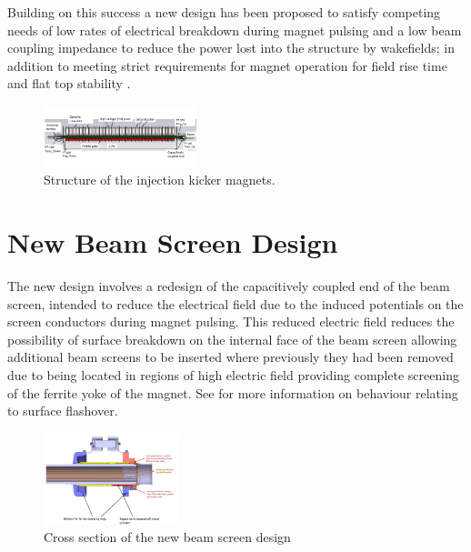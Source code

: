\documentclass[a4paper,
              ]{jacow}
\begin{document}
Building on this success a new design has been proposed to satisfy competing needs of low rates of electrical breakdown during magnet pulsing and a low beam coupling impedance to reduce the power lost into the structure by wakefields; in addition to meeting strict requirements for magnet operation for field rise time and flat top stability \cite{mkiUpgrade}. 

\begin{figure}
\includegraphics[width=0.4\textwidth]{MKICrossSectionYZ.pdf}
\caption{Structure of the injection kicker magnets.}
\label{fig:mkiStruct}
\end{figure}

\section{New Beam Screen Design}

The new design involves a redesign of the capacitively coupled end of the beam screen, intended to reduce the electrical field due to the induced potentials on the screen conductors during magnet pulsing. This reduced electric field reduces the possibility of surface breakdown on the internal face of the beam screen allowing additional beam screens to be inserted where previously they had been removed due to being located in regions of high electric field providing complete screening of the ferrite yoke of the magnet. See \cite{mki-ElecBreakdown} for more information on behaviour relating to surface flashover. 

\begin{figure}
\begin{center}
\includegraphics[width=0.35\textwidth]{beamScreenCrossSectionLabelled.pdf}
\caption{Cross section of the new beam screen design}
\label{fig:beamScreenCross}
\end{center}
\end{figure}
\end{document}
